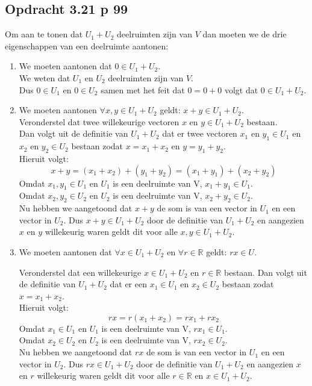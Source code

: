 \documentclass[lineaire_algebra_oplossingen.tex]{subfiles}
\begin{document}
\subsection{Opdracht 3.21 p 99}
Om aan te tonen dat $U_1 + U_2$ deelruimten zijn van $V$ dan moeten we de drie eigenschappen van een deelruimte aantonen:
\begin{enumerate}
\item We moeten aantonen dat $0 \in U_1 + U_2$.\\
We weten dat $U_1$ en $U_2$ deelruimten zijn van $V$.\\
Dus $0 \in U_1$ en $0 \in U_2$ samen met het feit dat $0 = 0 + 0$ volgt dat $0 \in U_1 + U_2$.

\item We moeten aantonen $\forall x,y \in U_1 + U_2$ geldt: $x + y \in U_1 + U_2$.\\
Veronderstel dat twee willekeurige vectoren $x$ en $y \in U_1 + U_2$ bestaan.\\
Dan volgt uit de definitie van $U_1 + U_2$ dat er twee vectoren $x_1$ en $y_1 \in U_1$ en $x_2$ en $y_2 \in U_2$ bestaan zodat $x = x_1 + x_2$ en $y = y_1 + y_2$.\\
Hieruit volgt:
$$x + y = (x_1 + x_2) + (y_1 + y_2) = (x_1 + y_1) + (x_2 + y_2)$$
Omdat $x_1, y_1 \in U_1$ en $U_1$ is een deelruimte van V, $x_1 + y_1 \in U_1$.\\
Omdat $x_2, y_2 \in U_2$ en $U_2$ is een deelruimte van V, $x_2 + y_2 \in U_2$.\\
Nu hebben we aangetoond dat $x+y$ de som is van een vector in $U_1$ en een vector in $U_2$. 
Dus $x + y \in U_1 + U_2$ door de definitie van $U_1 + U_2$ en aangezien $x$ en $y$ willekeurig waren geldt dit voor alle $x,y \in U_1 + U_2$.

\item We moeten aantonen dat $\forall x \in U_1 + U_2$ en $\forall r \in \mathbb{R}$ geldt: $rx \in U$.

Veronderstel dat een willekeurige $x \in U_1 + U_2$ en $r \in \mathbb{R}$ bestaan. Dan volgt uit de definitie van $U_1 + U_2$ dat er een $x_1 \in U_1$ en $x_2 \in U_2$ bestaan zodat $x = x_1 + x_2$.\\
Hieruit volgt:
$$rx = r(x_1+x_2) = rx_1+rx_2$$
Omdat $x_1 \in U_1$ en $U_1$ is een deelruimte van V, $rx_1 \in U_1$.\\
Omdat $x_2 \in U_2$ en $U_2$ is een deelruimte van V, $rx_2 \in U_2$.\\
Nu hebben we aangetoond dat $rx$ de som is van een vector in $U_1$ en een vector in $U_2$. 
Dus $rx \in U_1 + U_2$ door de definitie van $U_1 + U_2$ en aangezien $x$ en $r$ willekeurig waren geldt dit voor alle $r \in \mathbb{R}$ en $x \in U_1 + U_2$.
\end{enumerate}
\end{document}
